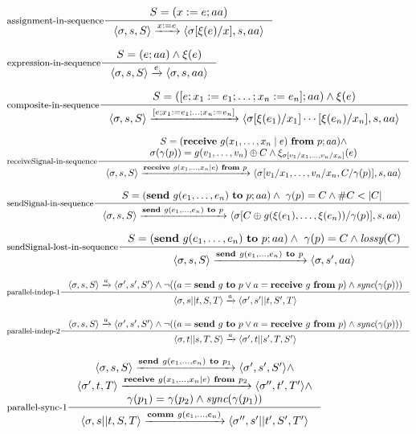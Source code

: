 \documentclass[parskip]{scrartcl}
\newcommand{\step}[1]{\xrightarrow{#1}}
\newcommand{\sync}{\textit{sync}}
\newcommand{\lossy}{\textit{lossy}}
\theoremstyle{definition}
\begin{document}
$\inference[assignment-in-sequence]{S = (x:=e; aa)}{\langle \sigma, s, S \rangle \step{x:=e} \langle \sigma[\xi(e) / x], s, aa \rangle}$

$\inference[expression-in-sequence]{S = (e;aa) \wedge \xi(e)}{\langle \sigma, s, S\rangle \step{e} \langle \sigma, s, aa \rangle}$

$\inference[composite-in-sequence]{S = ([e;x_1:=e_1;\ldots ; x_n:=e_n];aa) \wedge \xi(e)}{\langle \sigma, s, S\rangle \step{[e;x_1:=e_1;\ldots ; x_n:=e_n]} \langle \sigma[\xi(e_1)/x_1] \cdots [\xi(e_n)/x_n], s, aa\rangle }$

$\inference[receiveSignal-in-sequence]{S = (\textbf{receive}\ g(x_1,\ldots,x_n \mid e)\ \textbf{from}\ p;aa) \wedge\\ \sigma(\gamma(p)) = g(v_1,\ldots, v_n) \oplus C \wedge \xi_{\sigma[v_1/x_1,\ldots,v_n/x_n]}(e)}{\langle \sigma, s, S\rangle \step{\textbf{receive}\ g(x_1,\ldots,x_n \mid e)\ \textbf{from}\ p} \langle \sigma[v_1/x_1,\ldots,v_n/x_n,C/\gamma(p)],s,aa\rangle}$

$\inference[sendSignal-in-sequence]{S = (\textbf{send}\ g(e_1,\ldots,e_n)\ \textbf{to}\ p;aa) \wedge\ \gamma(p) = C \wedge \#C < |C|}{\langle \sigma, s, S\rangle \step{\textbf{send}\ g(e_1,\ldots,e_n)\ \textbf{to}\ p} \langle \sigma[C \oplus g(\xi(e_1),\ldots,\xi(e_n))/\gamma(p)],s,aa\rangle}$

$\inference[sendSignal-lost-in-sequence]{S = (\textbf{send}\ g(e_1,\ldots,e_n)\ \textbf{to}\ p;aa) \wedge\ \gamma(p) = C \wedge \lossy(C)}{\langle \sigma, s, S\rangle \step{\textbf{send}\ g(e_1,\ldots,e_n)\ \textbf{to}\ p} \langle \sigma,s',aa\rangle}$

$\inference[parallel-indep-1]{\langle \sigma, s, S \rangle \step{a} \langle \sigma', s', S' \rangle \wedge \neg((a = \textbf{send}\ g\ \textbf{to}\ p \vee a = \textbf{receive}\ g\ \textbf{from}\ p) \wedge \sync(\gamma(p)))}{\langle \sigma, s || t, S,T \rangle \step{a} \langle \sigma', s'||t,S',T\rangle}$

$\inference[parallel-indep-2]{\langle \sigma, s, S \rangle \step{a} \langle \sigma', s', S' \rangle \wedge \neg((a = \textbf{send}\ g\ \textbf{to}\ p \vee a = \textbf{receive}\ g\ \textbf{from}\ p) \wedge \sync(\gamma(p)))}{\langle \sigma, t||s, T,S\rangle \step{a} \langle \sigma', t||s', T,S'\rangle}$

$\inference[parallel-sync-1]{\langle \sigma, s, S \rangle \step{\textbf{send}\ g(e_1,\ldots, e_n)\ \textbf{to}\ p_1} \langle \sigma', s', S' \rangle \wedge\\
\langle \sigma', t, T\rangle \step{\textbf{receive}\ g(x_1,\ldots,x_n \mid e)\ \textbf{from}\ p_2} \langle \sigma'', t',T'\rangle \wedge\\
\gamma(p_1) = \gamma(p_2) \wedge \sync(\gamma(p_1))}{\langle \sigma, s||t, S, T \rangle \step{\textbf{comm}\ g(e_1,\ldots,e_n)} \langle \sigma'',s'||t',S',T' \rangle}$
\end{document}

